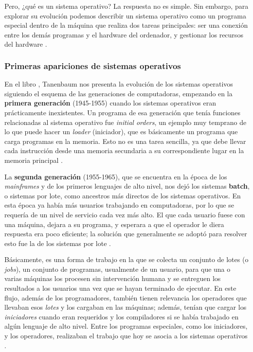 \documentclass[letterpaper,12pt,oneside]{book}
\begin{document}
		Pero, ¿qué es un sistema operativo? La respuesta no es simple. Sin embargo, para explorar su evolución podemos describir un sistema operativo como un programa especial 
		dentro de la máquina que realiza dos tareas principales: ser una conexión entre los demás programas y el hardware del ordenador, 
		y gestionar los recursos del hardware \cite{tanenbaum_modern_2002}.

        \subsubsection{Primeras apariciones de sistemas operativos}
        
		En el libro \cite{tanenbaum_modern_2002}, Tanenbaum nos presenta la evolución de los sistemas operativos siguiendo
		el esquema de las generaciones de computadoras, empezando en
		la \textbf{primera generación} (1945-1955) cuando los sistemas operativos eran prácticamente inexistentes. Un programa
        de esa generación que tenía funciones relacionadas al sistema operativo fue
    \textit{initial orders}, un ejemplo
		muy temprano de lo que puede hacer un \textit{loader} (iniciador), que es básicamente un programa que carga programas en la memoria. Esto no es una tarea sencilla,
		ya que debe llevar cada instrucción desde una memoria secundaria a su correspondiente lugar en la memoria principal \cite{salomon_assemblers_1992}.
		
		La \textbf{segunda generación} (1955-1965), que se encuentra en la época de los \textit{mainframes} y de los primeros lenguajes de alto nivel, nos dejó
		los sistemas \textbf{batch}, o sistemas por lote, como ancestros más directos de los sistemas operativos. En esta época ya había más usuarios trabajando en computadoras, por
		lo que se requería de un nivel de servicio cada vez más alto. El que cada usuario fuese con una máquina, dejara a su programa, y esperara a que el operador  le diera
		respuesta era poco eficiente; la solución que generalmente se adoptó para resolver esto fue la de los sistemas por lote \cite{tanenbaum_modern_2002}.
  
        Básicamente, es una forma de trabajo
		en la que se colecta un conjunto de lotes (o \textit{jobs}), un conjunto de programas, usualmente de un usuario, para que una o varias máquinas los procesen sin intervención 
		humana y se entreguen los resultados a los usuarios una vez que se hayan terminado de ejecutar. En este flujo, además de los programadores,
		también tienen relevancia los operadores que llevaban esos \textit{lotes} y los cargaban en las máquinas; además, tenían que cargar los \textit{iniciadores} cuando eran requeridos y los
		compiladores si se había trabajado en algún lenguaje de alto nivel. Entre los programas especiales, como los iniciadores, y los operadores, realizaban
		el trabajo que hoy se asocia a los sistemas operativos \cite{tanenbaum_modern_2002}.
		
\end{document}
